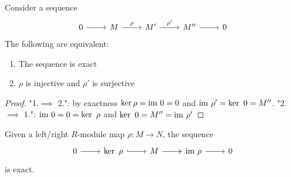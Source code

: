     \begin{lemma}\label{ExactnessIsEquivalentToInjFirstSESSurjSecondSES}
        Consider a sequence 
        $$\begin{tikzcd}
            0 \arrow[r] &M \arrow[r,"\rho"] & M' \arrow[r,"\rho'"] & M'' \arrow[r] & 0
        \end{tikzcd}$$
        The following are equivalent:
        \begin{enumerate}
            \item The sequence is exact
            \item $\rho $ is injective and $\rho'$ is surjective 
        \end{enumerate}
    \end{lemma}
    \begin{proof}
        "1.$\implies$ 2.": by exactness $\ker \rho = \mathrm{im}\ 0 = 0$ and $\mathrm{im}\ \rho' =\ker \ 0 = M''$.
        "2.$\implies$ 1.": $\mathrm{im} \ 0 = 0 = \ker \ \rho $ and $\ker \ 0 = M'' = \mathrm{im}\ \rho'$ \end{proof}
    \begin{corollary}
        Given a left/right $R$-module map $\rho : M \rightarrow N$, the sequence
        $$\begin{tikzcd}
            0 \arrow[r] & \ker \ \rho \arrow[hookrightarrow,r] & M \arrow[twoheadrightarrow, r] & \im \ \rho \arrow[r] &0 
        \end{tikzcd}$$
        is exact.
    \end{corollary}
